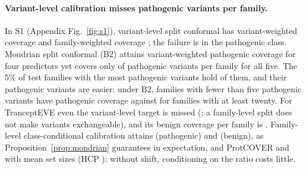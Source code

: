 \paragraph{Variant-level calibration misses pathogenic variants per family.}
In S1 (Appendix Fig.~\ref{fig:s1}), variant-level split conformal has variant-weighted coverage \sOneBoneCovVar{} and family-weighted coverage \sOneBoneCovFam{}; the failure is in the pathogenic class. Mondrian split conformal (B2) attains variant-weighted pathogenic coverage \sOneBtwoPathVar{} for four predictors yet covers only \sOneBtwoPath{} of pathogenic variants per family for all five. The 5\% of test families with the most pathogenic variants hold \sizeTopShare{} of them, and their pathogenic variants are easier: under B2, families with fewer than five pathogenic variants have pathogenic coverage \sizeCovFew{} against \sizeCovMany{} for families with at least twenty. For TranceptEVE even the variant-level target is missed (\sOneBtwoPathVarTrancept{}; a family-level split does not make variants exchangeable), and its benign coverage per family is \sOneBtwoBenignTrancept{}. Family-level class-conditional calibration attains \sOneHcpccPath{} (pathogenic) and \sOneHcpccBenign{} (benign), as Proposition~\ref{prop:mondrian} guarantees in expectation, and ProtCOVER \sOneCrPath{} and \sOneCrBenign{} with mean set sizes \sOneCrSize{} (HCP \sOneHcpSize{}): without shift, conditioning on the ratio costs little.

\begin{table}[t]
\vspace*{1pt}%
\caption{Worse-class shortfall below the 0.90 target, $\max\{0,0.9-\min(\Cov_0,\Cov_1)\}$, of class-conditional family-level methods at $\alpha=0.1$. Benchmark and temporal rows: mean (maximum) over the row's predictor-setting cells, S2 pooling $\beta\in\{0.5,1,2\}$; a maximum of 0.000 means the target is met in every cell. New-protein rows: the single result of that predictor and population (the row on benchmark lengths is exploratory). S5 violates A2. Last two rows: mean set size over the benchmark's shifted cells, at $\alpha=0.1$ and at pathogenic coverage 0.90 (interpolated).}
\label{tab:summary}
\centering\setlength{\tabcolsep}{2.5pt}

\end{table}

